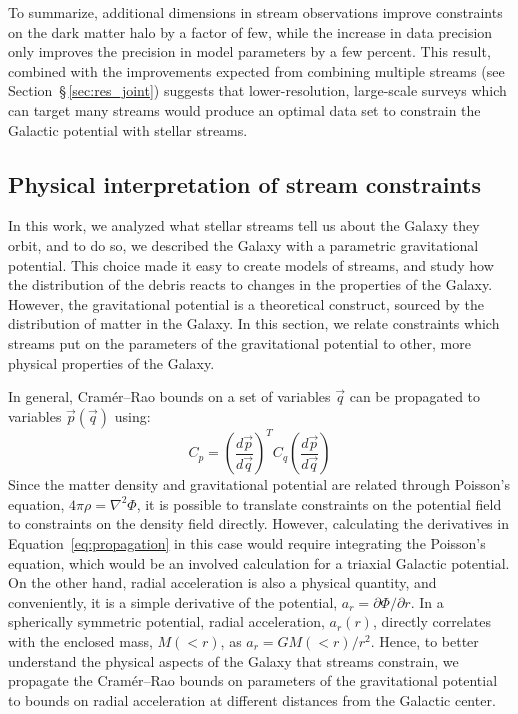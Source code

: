 \documentclass[modern]{aastex61}
\begin{document}
To summarize, additional dimensions in stream observations improve constraints on the dark matter halo by a factor of few, while the increase in data precision only improves the precision in model parameters by a few percent.
This result, combined with the improvements expected from combining multiple streams (see Section~\S\,\ref{sec:res_joint}) suggests that lower-resolution, large-scale surveys which can target many streams would produce an optimal data set to constrain the Galactic potential with stellar streams.

\subsection{Physical interpretation of stream constraints}
\label{sec:interpretation}
In this work, we analyzed what stellar streams tell us about the Galaxy they orbit, and to do so, we described the Galaxy with a parametric gravitational potential.
This choice made it easy to create models of streams, and study how the distribution of the debris reacts to changes in the properties of the Galaxy.
However, the gravitational potential is a theoretical construct, sourced by the distribution of matter in the Galaxy.
In this section, we relate constraints which streams put on the parameters of the gravitational potential to other, more physical properties of the Galaxy.

In general, Cram\'er--Rao bounds on a set of variables $\vec{q}$ can be propagated to variables $\vec{p}(\vec{q})$ using:
\begin{equation}
C_p = \left(\frac{d\vec{p}}{d\vec{q}}\right)^{T} C_q \left(\frac{d\vec{p}}{d\vec{q}}\right)
\label{eq:propagation}
\end{equation}
Since the matter density and gravitational potential are related through Poisson's equation, $4\pi\rho = \nabla^2\Phi$, it is possible to translate constraints on the potential field to constraints on the density field directly.
However, calculating the derivatives in Equation~\ref{eq:propagation} in this case would require integrating the Poisson's equation, which would be an involved calculation for a triaxial Galactic potential.
On the other hand, radial acceleration is also a physical quantity, and conveniently, it is a simple derivative of the potential, $a_r = \partial\Phi / \partial r$.
In a spherically symmetric potential, radial acceleration, $a_r(r)$, directly correlates with the enclosed mass, $M(<r)$, as $a_r = G M(<r)/r^2$.
Hence, to better understand the physical aspects of the Galaxy that streams constrain, we propagate the Cram\'er--Rao bounds on parameters of the gravitational potential to bounds on radial acceleration at different distances from the Galactic center.
\end{document}
